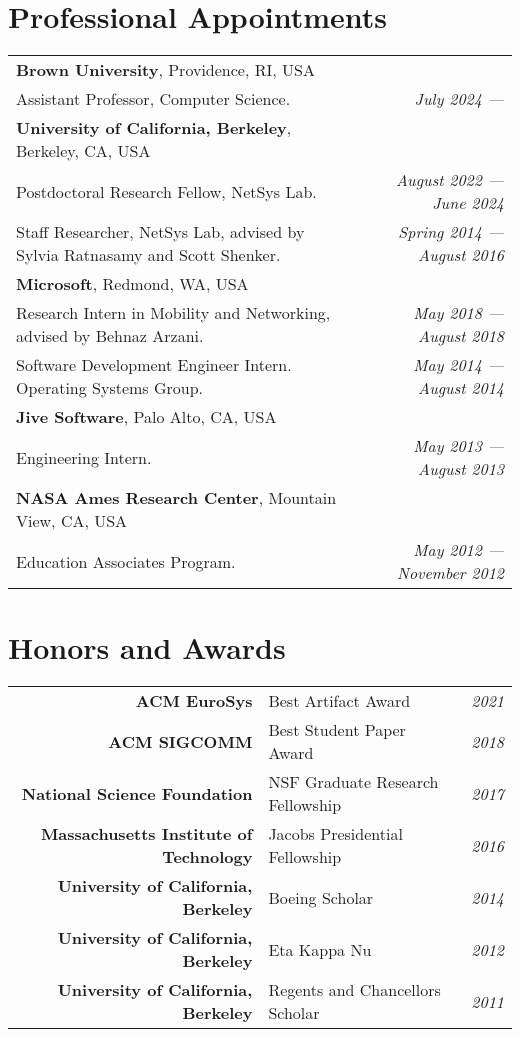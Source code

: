 \section{Professional Appointments}
\begin{tabular*}{\textwidth}{@{\hspace{1cm}}l@{\extracolsep{\fill}}r@{}}
\textbf{Brown University}, Providence, RI, USA  &\\
Assistant Professor, Computer Science. & \emph{July 2024 ---} \\
%
\noindent \textbf{University of California, Berkeley}, Berkeley, CA, USA &\\
Postdoctoral Research Fellow, NetSys Lab. & \emph{August 2022 --- June 2024} \\
Staff Researcher, NetSys Lab, advised by Sylvia Ratnasamy and Scott Shenker. & \emph{Spring 2014 --- August 2016}\\
%
\textbf{Microsoft}, Redmond, WA, USA &\\
Research Intern in Mobility and Networking, advised by Behnaz Arzani. & \emph{May 2018 --- August 2018} \\
Software Development Engineer Intern. Operating Systems Group. & \emph{May 2014 --- August 2014}\\
%
\textbf{Jive Software}, Palo Alto, CA, USA &\\
Engineering Intern. & \emph{May 2013 --- August 2013}\\
%
\textbf{NASA Ames Research Center}, Mountain View, CA, USA &\\
Education Associates Program. & \emph{May 2012 --- November 2012}\\
\end{tabular*}

\section{Honors and Awards}
\begin{tabular*}{\textwidth}{@{\hspace{1cm}}r@{\hspace{5pt}}l@{\extracolsep{\fill}}r@{}}
\textbf{ACM EuroSys}     & Best Artifact Award              & \emph{2021} \\
\textbf{ACM SIGCOMM}     & Best Student Paper Award         & \emph{2018} \\
\textbf{National Science Foundation}         & NSF Graduate Research Fellowship & \emph{2017} \\
\textbf{Massachusetts Institute of Technology}         & Jacobs Presidential Fellowship   & \emph{2016} \\
\textbf{University of California, Berkeley} & Boeing Scholar                   & \emph{2014} \\
\textbf{University of California, Berkeley} & Eta Kappa Nu                     & \emph{2012} \\
\textbf{University of California, Berkeley} & Regents and Chancellors Scholar  & \emph{2011} \\
\end{tabular*}
